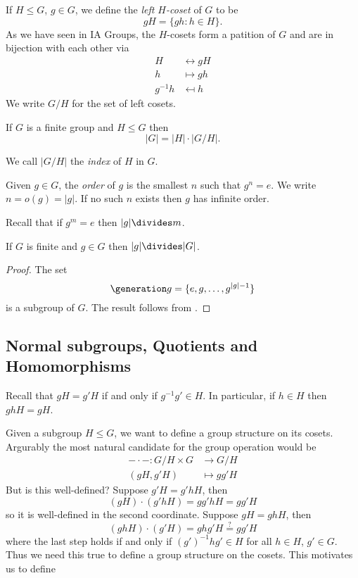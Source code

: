 \documentclass[a4paper]{article}
\theoremstyle{definition}
\begin{document}
If \(H \leq G\), \(g \in G\), we define the \emph{left \(H\)-coset} of \(G\) to be
\[
  gH = \{gh: h \in H\}.
\]
As we have seen in IA Groups, the \(H\)-cosets form a patition of \(G\) and are in bijection with each other via
\begin{align*}
  H &\leftrightarrow gH \\
  h &\mapsto gh \\
  g^{-1}h &\mapsfrom h
\end{align*}
We write \(G/H\) for the set of left cosets.

\begin{theorem}[Lagrange]
  \label{thm:lagrange}
  If \(G\) is a finite group and \(H \leq G \) then
  \[
    |G| = |H| \cdot |G/H|.
  \]
\end{theorem}

We call \(|G/H|\) the \emph{index} of \(H\) in \(G\).

\begin{definition}[Order]
  Given \(g \in G\), the \emph{order} of \(g\) is the smallest \(n\) such that \(g^n = e\). We write \(n = o(g) = |g|\). If no such \(n\) exists then \(g\) has infinite order.
\end{definition}

Recall that if \(g^m = e\) then \(|g| \divides m\).

\begin{lemma}
  If \(G\) is finite and \(g \in G\) then \(|g| \divides |G|\).
\end{lemma}

\begin{proof}
  The set
  \[
    \generation g = \{e, g, \dots, g^{|g| - 1}\}
  \]
  is a subgroup of \(G\). The result follows from .
\end{proof}

\subsection{Normal subgroups, Quotients and Homomorphisms}

Recall that \(gH = g'H\) if and only if \(g^{-1}g' \in H\). In particular, if \(h \in H\) then \(ghH = gH\).

Given a subgroup \(H \leq G\), we want to define a group structure on its cosets. Argurably the most natural candidate for the group operation would be
\begin{align*}
  - \cdot -: G/H \times G &\to G/H \\
  (gH, g'H) &\mapsto gg'H
\end{align*}
But is this well-defined? Suppose \(g'H = g'hH\), then
\[
  (gH) \cdot (g'hH) = gg'hH = gg'H
\]
so it is well-defined in the second coordinate. Suppose \(gH = ghH\), then
\[
  (ghH) \cdot (g'H) = ghg' H \stackrel{?}{=} gg'H
\]
where the last step holds if and only if \((g')^{-1}hg' \in H\) for all \(h \in H\), \(g' \in G\). Thus we need this true to define a group structure on the cosets. This motivates us to define
\end{document}
